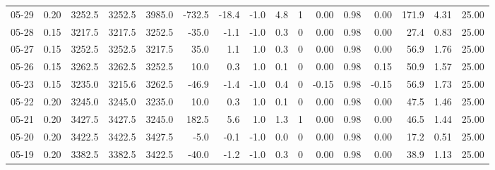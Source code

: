 \begin{threeparttable}
{\begin{tabular}{lrrrrrrrrrrrrrrr}
  05-29 &     0.20 & 3252.5 & 3252.5 & 3985.0 &     -732.5 &          -18.4 &                     -1.0 &                 4.8 &              1 &       0.00 &      0.98 &           0.00 &            171.9 &            4.31 &                  25.00 \\
  05-28 &     0.15 & 3217.5 & 3217.5 & 3252.5 &      -35.0 &           -1.1 &                     -1.0 &                 0.3 &              0 &       0.00 &      0.98 &           0.00 &             27.4 &            0.83 &                  25.00 \\
  05-27 &     0.15 & 3252.5 & 3252.5 & 3217.5 &       35.0 &            1.1 &                      1.0 &                 0.3 &              0 &       0.00 &      0.98 &           0.00 &             56.9 &            1.76 &                  25.00 \\
  05-26 &     0.15 & 3262.5 & 3262.5 & 3252.5 &       10.0 &            0.3 &                      1.0 &                 0.1 &              0 &       0.00 &      0.98 &           0.15 &             50.9 &            1.57 &                  25.00 \\
  05-23 &     0.15 & 3235.0 & 3215.6 & 3262.5 &      -46.9 &           -1.4 &                     -1.0 &                 0.4 &              0 &      -0.15 &      0.98 &          -0.15 &             56.9 &            1.73 &                  25.00 \\
  05-22 &     0.20 & 3245.0 & 3245.0 & 3235.0 &       10.0 &            0.3 &                      1.0 &                 0.1 &              0 &       0.00 &      0.98 &           0.00 &             47.5 &            1.46 &                  25.00 \\
  05-21 &     0.20 & 3427.5 & 3427.5 & 3245.0 &      182.5 &            5.6 &                      1.0 &                 1.3 &              1 &       0.00 &      0.98 &           0.00 &             46.5 &            1.44 &                  25.00 \\
  05-20 &     0.20 & 3422.5 & 3422.5 & 3427.5 &       -5.0 &           -0.1 &                     -1.0 &                 0.0 &              0 &       0.00 &      0.98 &           0.00 &             17.2 &            0.51 &                  25.00 \\
  05-19 &     0.20 & 3382.5 & 3382.5 & 3422.5 &      -40.0 &           -1.2 &                     -1.0 &                 0.3 &              0 &       0.00 &      0.98 &           0.00 &             38.9 &            1.13 &                  25.00 \\

\end{tabular}}
\end{threeparttable}

